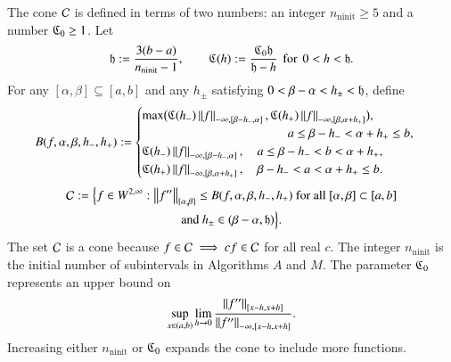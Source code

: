 \documentclass[review]{elsarticle}
\theoremstyle{definition}
\renewcommand{\cw}{W}
\DeclareMathOperator{\ninit}{ninit}
\begin{document}
The cone $\cc$ is defined in terms of two numbers: an integer $n_{\ninit} \ge 5$
and a  number $\fC_0 \ge 1$. Let
\begin{equation}
\label{hCdef}
\fh := \frac{3(b-a)}{n_{\ninit}-1}, \qquad \fC(h) := \frac{\fC_0 \fh}{\fh - h} 
\mbox{\, for \,} 0<h<\fh.
\end{equation}
For any $[\alpha, \beta] \subseteq [a,b]$ and any $h_{\pm}$ satisfying $0 <
\beta - \alpha < h_{\pm} < \fh$, define
\begin{equation} \label{tbdef}
B(f,\alpha,\beta,h_-,h_+) :=
\begin{cases}
   \max\bigl(\fC(h_{-}) \norm[-\infty,{[\beta-h_-,\alpha]}]{f},\fC(h_{+}) 
   \norm[-\infty,{[\beta, \alpha+h_+]}]{f}\bigr), 
\\                                             \hspace{26ex} a \le \beta- h_- <  \alpha + h_+ \le b,
\\ \fC(h_{-}) \norm[-\infty,{[\beta-h_-,\alpha]}]{f},  \quad a \le \beta- h_- < b< \alpha + h_+,
\\ \fC(h_{+}) \norm[-\infty,{[\beta, \alpha+h_+]}]{f}, 
\quad \beta- h_- <  a  < \alpha + h_+ \le b.
\end{cases} 
\end{equation}
\begin{multline} \label{conedef}
 \cc := \Bigl \{
 f  \in    \cw^{2,\infty}:   \norm[{[\alpha,\beta]}]{f''}  \le B(f,\alpha,\beta,h_-,h_+)  
 \text{ for all } [\alpha,\beta] \subset [a,b]
\\ \text{and } h_{\pm} \in (\beta - \alpha,  \fh)  \Bigr \}.
\end{multline}
The set $\cc$ is a cone because $f \in \cc \implies cf \in \cc$ for all real
$c$. The integer $n_{\ninit}$ is the initial number of subintervals in
Algorithms $A$ and $M$. The parameter $\fC_0$ represents an upper bound on
\[
\sup_{x \in (a,b)} \lim_{h \to 0} \frac{\norm[{[x-h,x+h]}]{f''}}{\norm[-\infty,{[x-h,x+h]}]{f''}}.
\]
 Increasing either $n_{\ninit}$ or $\fC_0$ expands the cone to
include more functions.
\end{document}
